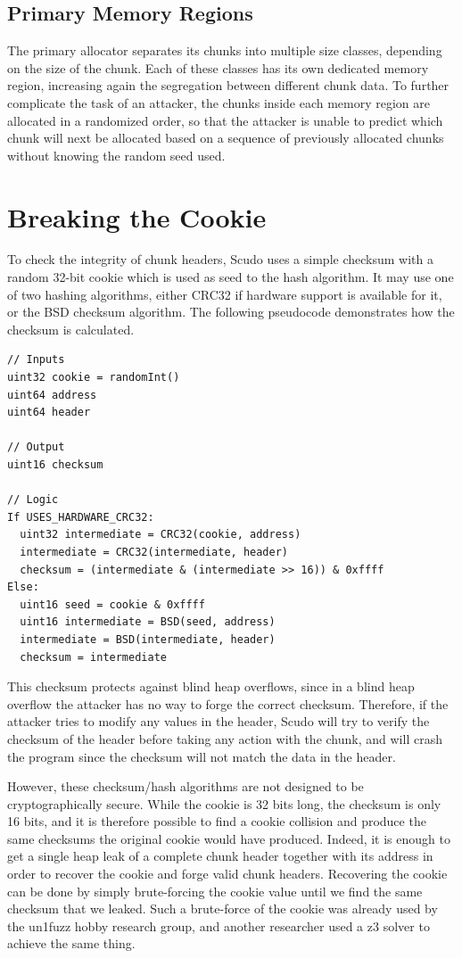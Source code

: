 \documentclass[a4paper,11pt,oneside]{report}
\begin{document}
\section{Primary Memory Regions}

The primary allocator separates its chunks into multiple size classes, depending on the
size of the chunk. Each of these classes has its own dedicated memory region, increasing
again the segregation between different chunk data. To further complicate the task of an
attacker, the chunks inside each memory region are allocated in a randomized order, so
that the attacker is unable to predict which chunk will next be allocated based on a
sequence of previously allocated chunks without knowing the random seed used.

\chapter{Breaking the Cookie}

To check the integrity of chunk headers, Scudo uses a simple checksum with a random 32-bit
cookie which is used as seed to the hash algorithm. It may use one of two hashing
algorithms, either CRC32 if hardware support is available for it, or the BSD checksum
algorithm. The following pseudocode demonstrates how the checksum is calculated.
\begin{verbatim}
// Inputs
uint32 cookie = randomInt()
uint64 address
uint64 header

// Output
uint16 checksum

// Logic
If USES_HARDWARE_CRC32:
  uint32 intermediate = CRC32(cookie, address)
  intermediate = CRC32(intermediate, header)
  checksum = (intermediate & (intermediate >> 16)) & 0xffff
Else:
  uint16 seed = cookie & 0xffff
  uint16 intermediate = BSD(seed, address)
  intermediate = BSD(intermediate, header)
  checksum = intermediate
\end{verbatim}

This checksum protects against blind heap overflows, since in a blind heap overflow the
attacker has no way to forge the correct checksum. Therefore, if the attacker tries to
modify any values in the header, Scudo will try to verify the checksum of the header
before taking any action with the chunk, and will crash the program since the checksum
will not match the data in the header.

However, these checksum/hash algorithms are not designed to be cryptographically
secure. While the cookie is 32 bits long, the checksum is only 16 bits, and it is
therefore possible to find a cookie collision and produce the same checksums the original
cookie would have produced. Indeed, it is enough to get a single heap leak of a complete
chunk header together with its address in order to recover the cookie 
and forge valid chunk headers.
Recovering the cookie can be done by simply brute-forcing the
cookie value until we find the same checksum that we leaked. Such a brute-force of the
cookie was already used by the un1fuzz hobby research group, and another researcher used a
z3 solver to achieve the same thing.~\cite{un1fuzz}~\cite{z3SolveScudoCookie}
\end{document}
